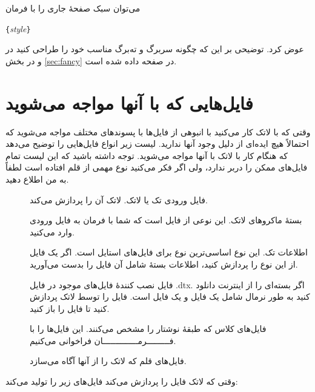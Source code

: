 {می‌توان سبک‌ صفحهٔ جاری را با فرمان 
\begin{lscommand}
\verb|{|\emph{style}\verb|}|
\end{lscommand}
عوض کرد. توضیحی بر این که چگونه سربرگ و ته‌برگ مناسب خود را طراحی کنید در \companion{} و در بخش 
\ref{sec:fancy}
 در صفحه 
\pageref{sec:fancy} داده شده است.
%
%
\pagebreak
\section{فایل‌هایی که با آنها مواجه می‌شوید}

وقتی که با لاتک کار می‌کنید با انبوهی از فایل‌ها با پسوندهای
%
مختلف مواجه می‌شوید که احتمالاً هیچ ایده‌ای از دلیل وجود آنها ندارید. لیست زیر %
انواع فایل‌هایی را توضیح می‌دهد که هنگام کار با لاتک با آنها مواجه می‌شوید. توجه داشته باشید که این لیست تمام فایل‌های ممکن را دربر ندارد، ولی اگر فکر می‌کنید نوع مهمی از قلم افتاده است لطفاً به من اطلاع دهید.

\begin{description}
  
\item[] فایل ورودی تک یا لاتک. لاتک آن را پردازش می‌کند.

\item[] بستهٔ ماکروهای لاتک. این نوعی از فایل است که شما با فرمان  به فایل ورودی وارد می‌کنید.

\item[] اطلاعات تک. این نوع اساسی‌ترین نوع برای فایل‌های استایل است. اگر یک فایل از این نوع را پردازش کنید، اطلاعات بستهٔ شامل آن فایل را بدست می‌آورید.

\item[] فایل نصب کنندهٔ فایل‌های موجود در فایل \textrm{.dtx}. اگر بسته‌ای را از اینترنت دانلود کنید به طور نرمال شامل یک فایل  و یک فایل 
 است. فایل  را توسط لاتک پردازش کنید تا فایل  را باز کنید.
\item[] فایل‌های کلاس که طبقهٔ نوشتار را مشخص می‌کنند. این فایل‌ها را با فـــــــــرمــــــــــــــان  فراخوانی می‌کنیم.
\item[] فایل‌های قلم که لاتک را از آنها آگاه می‌سازد.
\end{description}
وقتی که لاتک فایل را پردازش می‌کند فایل‌های زیر را تولید می‌کند:

}
